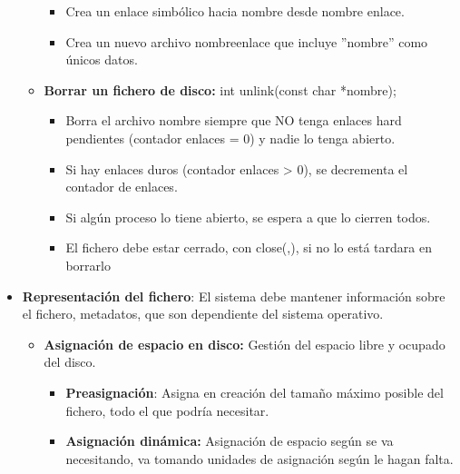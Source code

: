\documentclass[12pt, twoside, openright]{report} %
\begin{document}
\begin{itemize}
\begin{itemize}
\begin{itemize}
      \item Crea un enlace simbólico hacia nombre desde nombre enlace.
        
      \item Crea un nuevo archivo nombreenlace que incluye ''nombre'' como
        únicos datos.
        
      \end{itemize}
    \item \textbf{Borrar un fichero de disco:} int unlink(const char
      *nombre);
      

      \begin{itemize}
      \item Borra el archivo nombre siempre que NO tenga enlaces hard
        pendientes (contador enlaces = 0) y nadie lo tenga abierto.
        
      \item Si hay enlaces duros (contador enlaces \textgreater{} 0), se
        decrementa el contador de enlaces.
        
      \item Si algún proceso lo tiene abierto, se espera a que lo cierren
        todos.
        
      \item El fichero debe estar cerrado, con close(,), si no lo está
        tardara en borrarlo
        
      \end{itemize}
    \end{itemize}
	\pagebreak
  \item \textbf{Representación del fichero}: El sistema debe mantener
    información sobre el fichero, metadatos, que son dependiente del
    sistema operativo.
    

    \begin{itemize}
    \item \textbf{Asignación de espacio en disco:} Gestión del espacio libre
      y ocupado del disco.
      

      \begin{itemize}
      \item \textbf{Preasignación}: Asigna en creación del tamaño máximo
        posible del fichero, todo el que podría necesitar.
        
      \item \textbf{Asignación dinámica:} Asignación de espacio según se va
        necesitando, va tomando unidades de asignación según le hagan
        falta.
        

\end{itemize}
\end{itemize}
\end{itemize}
\end{document}
